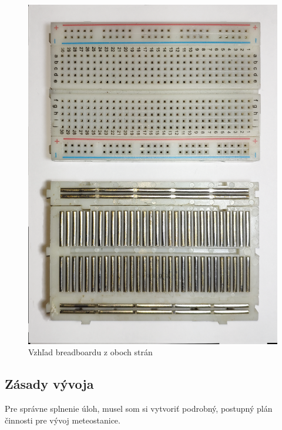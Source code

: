 \begin{figure}[!ht]
    \centering
    \includegraphics[width=\textwidth]{figures/breadboard}
    \caption{Vzhľad breadboardu z oboch strán\label{breadboard}\cite{breadboard}}
\end{figure}

\subsection{Zásady vývoja}
Pre správne splnenie úloh, musel som si vytvoriť podrobný, postupný plán činnosti pre vývoj meteostanice. 

